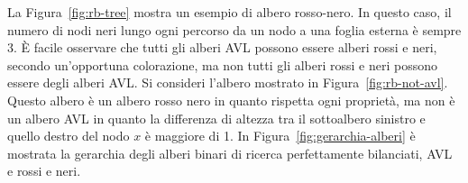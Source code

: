 
La Figura~\ref{fig:rb-tree} mostra un esempio di albero rosso-nero. In questo caso, il numero di nodi neri lungo ogni percorso da un nodo a una foglia esterna è sempre 3. È facile osservare che tutti gli alberi AVL possono essere alberi rossi e neri, secondo un'opportuna colorazione, ma non tutti gli alberi rossi e neri possono essere degli alberi AVL. Si consideri l'albero mostrato in Figura~\ref{fig:rb-not-avl}. Questo albero è un albero rosso nero in quanto rispetta ogni proprietà, ma non è un albero AVL in quanto la differenza di altezza tra il sottoalbero sinistro e quello destro del nodo $x$ è maggiore di 1. In Figura~\ref{fig:gerarchia-alberi} è mostrata la gerarchia degli alberi binari di ricerca perfettamente bilanciati, AVL e rossi e neri.

